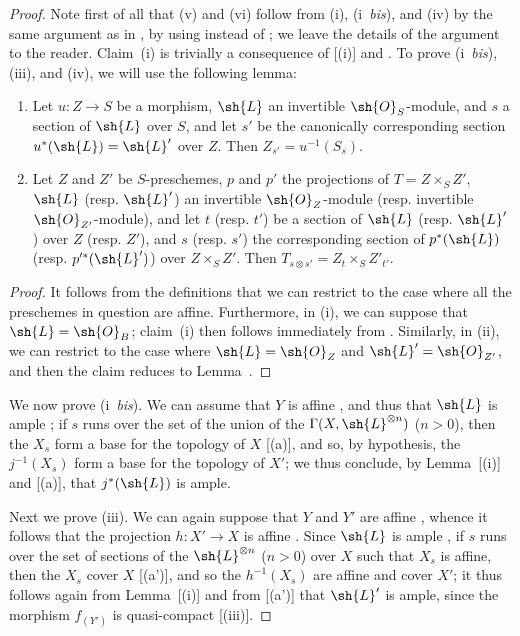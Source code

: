 \begin{proof}
Note first of all that (v) and (vi) follow from (i), (i~\emph{bis}), and (iv) by the same argument as in , by using  instead of ;
we leave the details of the argument to the reader.
Claim~(i) is trivially a consequence of [(i)] and .
To prove (i~\emph{bis}), (iii), and (iv), we will use the following lemma:
  \begin{lemma}[4.6.13.1]
  \label{II.4.6.13.1}
  \begin{enumerate}
    \item[\rm{(i)}] Let $u:Z\to S$ be a morphism, $\sh{L}$ an invertible $\sh{O}_S$-module, and $s$ a section of $\sh{L}$ over $S$, and let $s'$ be the canonically corresponding section $u^*(\sh{L})=\sh{L}'$ over $Z$.
      Then $Z_{s'}=u^{-1}(S_s)$.
    \item[\rm{(ii)}] Let $Z$ and $Z'$ be $S$-preschemes, $p$ and $p'$ the projections of $T=Z\times_S Z'$, $\sh{L}$ (resp. $\sh{L}'$) an invertible $\sh{O}_Z$-module (resp. invertible $\sh{O}_{Z'}$-module), and let $t$ (resp. $t'$) be a section of $\sh{L}$ (resp. $\sh{L}'$) over $Z$ (resp. $Z'$), and $s$ (resp. $s'$) the corresponding section of $p^*(\sh{L})$ (resp. $p'^*(\sh{L}')$) over $Z\times_S Z'$.
      Then $T_{s\otimes s'}=Z_t\times_S Z'_{t'}$.
  \end{enumerate}
  \end{lemma}

  \begin{proof}
  It follows from the definitions that we can restrict to the case where all the preschemes in question are affine.
  Furthermore, in (i), we can suppose that $\sh{L}=\sh{O}_B$;
  claim~(i) then follows immediately from .
  Similarly, in (ii), we can restrict to the case where $\sh{L}=\sh{O}_Z$ and $\sh{L}'=\sh{O}_{Z'}$, and then the claim reduces to Lemma~.
  \end{proof}

We now prove (i~\emph{bis}).
We can assume that $Y$ is affine , and thus that $\sh{L}$ is ample ;
if $s$ runs over the set of the union of the $\Gamma(X,\sh{L}^{\otimes n})$ ($n>0$), then the $X_s$ form a base for the topology of $X$ [(a)], and so, by hypothesis, the $j^{-1}(X_s)$ form a base for the topology of $X'$;
we thus conclude, by Lemma~[(i)] and [(a)], that $j^*(\sh{L})$ is ample.

Next we prove (iii).
We can again suppose that $Y$ and $Y'$ are affine , whence it follows that the projection $h:X'\to X$ is affine .
Since $\sh{L}$ is ample , if $s$ runs over the set of sections of the $\sh{L}^{\otimes n}$ ($n>0$) over $X$ such that $X_s$ is affine, then the $X_s$ cover $X$ [(a')], and so the $h^{-1}(X_s)$ are affine  and cover $X'$;
it thus follows again from Lemma~[(i)] and from [(a')] that $\sh{L}'$ is ample, since the morphism $f_{(Y')}$ is quasi-compact [(iii)].


\end{proof}
